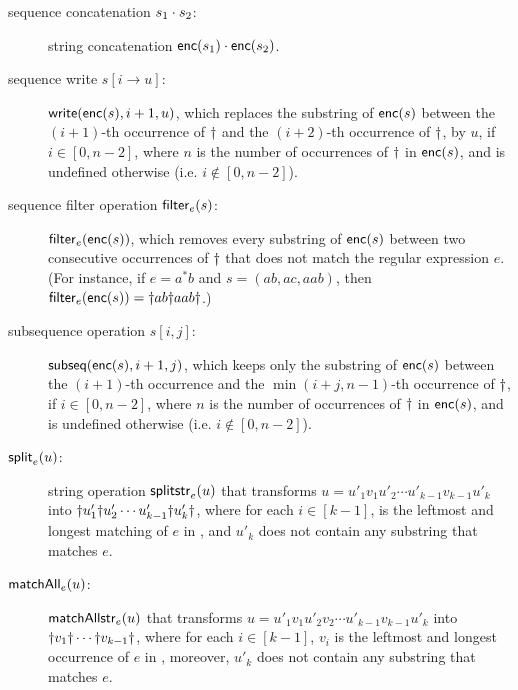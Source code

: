 \begin{description}
\item[sequence concatenation $s_1 \cdot s_2$:] %
string concatenation  ${\sf enc}(s_1) \cdot {\sf enc}(s_2)$. 
%
\item[sequence  write {$s[i \rightarrow u]$}: ] 
$\mathsf{write}({\sf enc}(s), i+1, u)$, which replaces the substring of ${\sf enc}(s)$ between the $(i+1)$-th occurrence of $\dag$ and the $(i+2)$-th occurrence of $\dag$, by $u$, if $i\in[0,n-2]$, where $n$ is the number of occurrences of $\dag$ in ${\sf enc}(s)$, and is undefined otherwise (i.e. $i\not\in[0,n-2]$). 

\item[sequence filter operation ${\sf filter}_e(s)$:] %
${\sf filter}_e({\sf enc}(s))$, which removes every substring of ${\sf enc}(s)$ between two consecutive occurrences of $\dag$ that does not match the regular expression $e$. (For instance, if $e = a^* b$ and $s = (ab, ac, aab)$, then ${\sf filter}_e({\sf enc}(s)) = \dag ab \dag aab \dag$.)
%
\item[subsequence operation {$s[i, j]$}:] %
${\sf subseq}({\sf enc}(s), i+1, j)$, which keeps only the substring of ${\sf enc}(s)$ between the $(i+1)$-th occurrence and the $\min(i+j, n-1)$-th occurrence of $\dag$, if $i\in[0,n-2]$, where $n$ is the number of occurrences of $\dag$ in ${\sf enc}(s)$, and  is undefined otherwise (i.e. $i\not\in[0,n-2]$). 
%
\item [$\mathsf{split}_e(u)$:] string operation $\mathsf{splitstr}_e(u)$ that transforms $u = u'_1 v_1 u'_2 \cdots u'_{k-1} v_{k-1} u'_k$ into  $\dag u'_1 \dag u'_2 \cdots u'_{k-1} \dag u'_k \dag$, where for each $i \in [k-1]$,   is the leftmost and longest matching of $e$ in , and $u'_k$ does not contain any substring that matches $e$. 
%
%
\item[$\mathsf{matchAll}_e(u)$:] %
$\mathsf{matchAllstr}_e(u)$ that transforms $u = u'_1 v_1 u'_2 v_2 \cdots u'_{k-1}v_{k-1} u'_k$ into 
$\dag v_1 \dag \cdots \dag v_{k-1} \dag$, where for each $i \in [k-1]$, $v_i$ is the leftmost and longest occurrence of $e$ in , moreover, $u'_k$ does not contain any substring that matches $e$.


\end{description}
